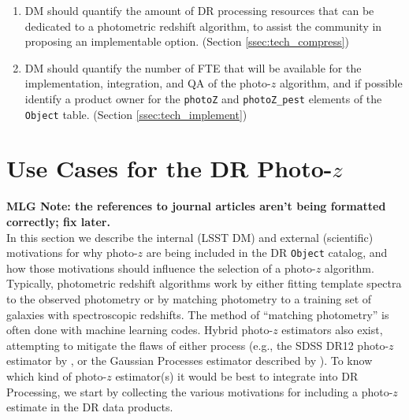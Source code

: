 \documentclass[DM,lsstdraft,toc]{lsstdoc}
\begin{document}
\begin{enumerate}
\item DM should quantify the amount of DR processing resources that can be dedicated to a photometric redshift algorithm, to assist the community in proposing an implementable option. (Section \ref{ssec:tech_compress})
\item DM should quantify the number of FTE that will be available for the implementation, integration, and QA of the photo-$z$ algorithm, and if possible identify a product owner for the {\tt photoZ} and {\tt photoZ\_pest} elements of the {\tt Object} table. (Section \ref{ssec:tech_implement})
\end{enumerate}


\section{Use Cases for the DR Photo-$z$}\label{sec:motivation}

{\bf MLG Note: the references to journal articles aren't being formatted correctly; fix later.} \\
In this section we describe the internal (LSST DM) and external (scientific) motivations for why photo-$z$ are being included in the DR {\tt Object} catalog, and how those motivations should influence the selection of a photo-$z$ algorithm. Typically, photometric redshift algorithms work by either fitting template spectra to the observed photometry or by matching photometry to a training set of galaxies with spectroscopic redshifts. The method of ``matching photometry'' is often done with machine learning codes. Hybrid photo-$z$ estimators also exist, attempting to mitigate the flaws of either process (e.g., the SDSS DR12 photo-$z$ estimator by \citet{2016MNRAS.460.1371B}, or the Gaussian Processes estimator described by \citet{2017ApJ...838....5L}). To know which kind of photo-$z$ estimator(s) it would be best to integrate into DR Processing, we start by collecting the various motivations for including a photo-$z$ estimate in the DR data products.
\end{document}
